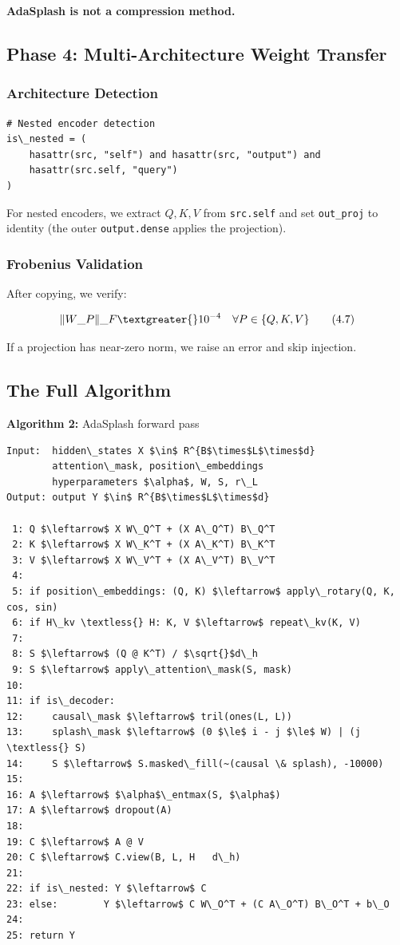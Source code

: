 \textbf{AdaSplash is not a compression method.}

\subsection{Phase 4: Multi-Architecture Weight Transfer}

\subsubsection{Architecture Detection}

\begin{lstlisting}
# Nested encoder detection
is\_nested = (
    hasattr(src, "self") and hasattr(src, "output") and
    hasattr(src.self, "query")
)
\end{lstlisting}

For nested encoders, we extract $Q, K, V$ from \texttt{src.self} and set 
\texttt{out\_proj} to identity (the outer \texttt{output.dense} applies the projection).

\subsubsection{Frobenius Validation}

After copying, we verify:

\[
\|W\_P\|\_F \textgreater{} 10^{-4} \quad \forall P \in \{Q, K, V\}
\tag{4.7}
\]

If a projection has near-zero norm, we raise an error and skip injection.

\subsection{The Full Algorithm}

\textbf{Algorithm 2:} AdaSplash forward pass
\begin{lstlisting}
Input:  hidden\_states X $\in$ R^{B$\times$L$\times$d}
        attention\_mask, position\_embeddings
        hyperparameters $\alpha$, W, S, r\_L
Output: output Y $\in$ R^{B$\times$L$\times$d}

 1: Q $\leftarrow$ X W\_Q^T + (X A\_Q^T) B\_Q^T
 2: K $\leftarrow$ X W\_K^T + (X A\_K^T) B\_K^T
 3: V $\leftarrow$ X W\_V^T + (X A\_V^T) B\_V^T
 4:
 5: if position\_embeddings: (Q, K) $\leftarrow$ apply\_rotary(Q, K, cos, sin)
 6: if H\_kv \textless{} H: K, V $\leftarrow$ repeat\_kv(K, V)
 7:
 8: S $\leftarrow$ (Q @ K^T) / $\sqrt{}$d\_h
 9: S $\leftarrow$ apply\_attention\_mask(S, mask)
10:
11: if is\_decoder:
12:     causal\_mask $\leftarrow$ tril(ones(L, L))
13:     splash\_mask $\leftarrow$ (0 $\le$ i - j $\le$ W) | (j \textless{} S)
14:     S $\leftarrow$ S.masked\_fill(~(causal \& splash), -10000)
15:
16: A $\leftarrow$ $\alpha$\_entmax(S, $\alpha$)
17: A $\leftarrow$ dropout(A)
18:
19: C $\leftarrow$ A @ V
20: C $\leftarrow$ C.view(B, L, H   d\_h)
21:
22: if is\_nested: Y $\leftarrow$ C
23: else:        Y $\leftarrow$ C W\_O^T + (C A\_O^T) B\_O^T + b\_O
24:
25: return Y
\end{lstlisting}

